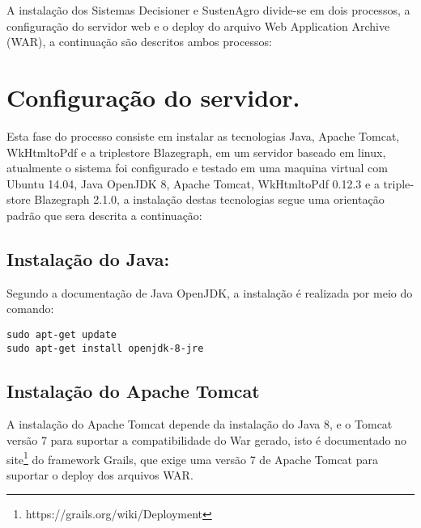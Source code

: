 A instalação dos Sistemas Decisioner e SustenAgro divide-se em dois
processos, a configuração do servidor web e o \foreignlanguage{english}{deploy}
do arquivo \foreignlanguage{english}{Web Application Archive (WAR)},
a continuação são descritos ambos processos:

\section{Configuração do servidor.}

Esta fase do processo consiste em instalar as tecnologias Java, Apache
\foreignlanguage{english}{Tomcat}, \foreignlanguage{english}{WkHtmltoPdf}
e a \foreignlanguage{english}{triplestore} \foreignlanguage{english}{Blazegraph},
em um servidor baseado em \foreignlanguage{english}{linux}, atualmente
o sistema foi configurado e testado em uma maquina virtual com Ubuntu
14.04, Java \foreignlanguage{english}{OpenJDK} 8, Apache \foreignlanguage{english}{Tomcat},
\foreignlanguage{english}{WkHtmltoPdf} 0.12.3 e a \foreignlanguage{english}{triplestore}
\foreignlanguage{english}{Blazegraph} 2.1.0, a instalação destas tecnologias
segue uma orientação padrão que sera descrita a continuação:

\subsection*{Instalação do Java:}

Segundo a documentação de Java \foreignlanguage{english}{OpenJDK},
a instalação é realizada por meio do comando:

\begin{lstlisting}
sudo apt-get update
sudo apt-get install openjdk-8-jre
\end{lstlisting}

\subsection*{Instalação do \foreignlanguage{english}{Apache Tomcat}}

A instalação do \foreignlanguage{english}{Apache Tomcat} depende da
instalação do Java 8, e o \foreignlanguage{english}{Tomcat} versão
7 para suportar a compatibilidade do \foreignlanguage{english}{War}
gerado, isto é documentado no site\footnote{https://grails.org/wiki/Deployment}
do framework \foreignlanguage{english}{Grails}, que exige uma versão
7 de \foreignlanguage{english}{Apache Tomcat} para suportar o \foreignlanguage{english}{deploy}
dos arquivos \foreignlanguage{english}{WAR}.

